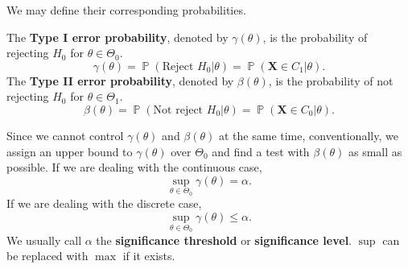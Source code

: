 \documentclass{huhtakm-template-book-v2}
\DeclareMathOperator{\prob}{\mathbb{P}}
\begin{document}
    We may define their corresponding probabilities.
    \begin{defn}
        The \textbf{Type I error probability}, denoted by $\gamma(\theta)$, is the probability of rejecting $H_{0}$ for $\theta\in\Theta_{0}$.
        \begin{equation*}
            \gamma(\theta)=\prob(\text{Reject }H_{0}|\theta)=\prob(\mathbf{X}\in C_{1}|\theta).
        \end{equation*}
        The \textbf{Type II error probability}, denoted by $\beta(\theta)$, is the probability of not rejecting $H_{0}$ for $\theta\in\Theta_{1}$.
        \begin{equation*}
            \beta(\theta)=\prob(\text{Not reject }H_{0}|\theta)=\prob(\mathbf{X}\in C_{0}|\theta).
        \end{equation*}
    \end{defn}
    \begin{rem}
        Since we cannot control $\gamma(\theta)$ and $\beta(\theta)$ at the same time, conventionally, we assign an upper bound to $\gamma(\theta)$ over $\Theta_{0}$ and find a test with $\beta(\theta)$ as small as possible. If we are dealing with the continuous case,
        \begin{equation*}
            \sup_{\theta\in\Theta_{0}}\gamma(\theta)=\alpha.
        \end{equation*}
        If we are dealing with the discrete case,
        \begin{equation*}
            \sup_{\theta\in\Theta_{0}}\gamma(\theta)\leq\alpha.
        \end{equation*}
        We usually call $\alpha$ the \textbf{significance threshold} or \textbf{significance level}. $\sup$ can be replaced with $\max$ if it exists.
    \end{rem}
\end{document}
